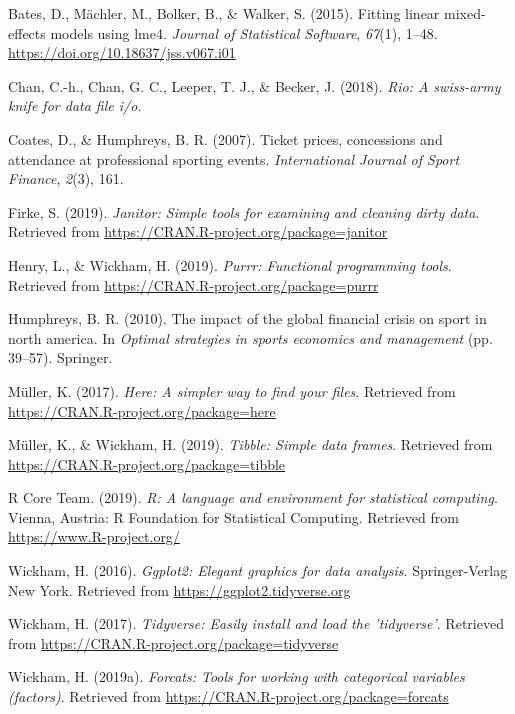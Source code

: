 \documentclass[man, fleqn, noextraspace,floatsintext]{apa6}
\begin{document}
\hypertarget{ref-R-lme4}{}
Bates, D., Mächler, M., Bolker, B., \& Walker, S. (2015). Fitting linear
mixed-effects models using lme4. \emph{Journal of Statistical Software},
\emph{67}(1), 1--48. \url{https://doi.org/10.18637/jss.v067.i01}

\hypertarget{ref-R-rio}{}
Chan, C.-h., Chan, G. C., Leeper, T. J., \& Becker, J. (2018).
\emph{Rio: A swiss-army knife for data file i/o}.

\hypertarget{ref-coates_humphreys_2007}{}
Coates, D., \& Humphreys, B. R. (2007). Ticket prices, concessions and
attendance at professional sporting events. \emph{International Journal
of Sport Finance}, \emph{2}(3), 161.

\hypertarget{ref-R-janitor}{}
Firke, S. (2019). \emph{Janitor: Simple tools for examining and cleaning
dirty data}. Retrieved from
\url{https://CRAN.R-project.org/package=janitor}

\hypertarget{ref-R-purrr}{}
Henry, L., \& Wickham, H. (2019). \emph{Purrr: Functional programming
tools}. Retrieved from \url{https://CRAN.R-project.org/package=purrr}

\hypertarget{ref-humphreys_2010}{}
Humphreys, B. R. (2010). The impact of the global financial crisis on
sport in north america. In \emph{Optimal strategies in sports economics
and management} (pp. 39--57). Springer.

\hypertarget{ref-R-here}{}
Müller, K. (2017). \emph{Here: A simpler way to find your files}.
Retrieved from \url{https://CRAN.R-project.org/package=here}

\hypertarget{ref-R-tibble}{}
Müller, K., \& Wickham, H. (2019). \emph{Tibble: Simple data frames}.
Retrieved from \url{https://CRAN.R-project.org/package=tibble}

\hypertarget{ref-R-base}{}
R Core Team. (2019). \emph{R: A language and environment for statistical
computing}. Vienna, Austria: R Foundation for Statistical Computing.
Retrieved from \url{https://www.R-project.org/}

\hypertarget{ref-R-ggplot2}{}
Wickham, H. (2016). \emph{Ggplot2: Elegant graphics for data analysis}.
Springer-Verlag New York. Retrieved from
\url{https://ggplot2.tidyverse.org}

\hypertarget{ref-R-tidyverse}{}
Wickham, H. (2017). \emph{Tidyverse: Easily install and load the
'tidyverse'}. Retrieved from
\url{https://CRAN.R-project.org/package=tidyverse}

\hypertarget{ref-R-forcats}{}
Wickham, H. (2019a). \emph{Forcats: Tools for working with categorical
variables (factors)}. Retrieved from
\url{https://CRAN.R-project.org/package=forcats}
\end{document}
